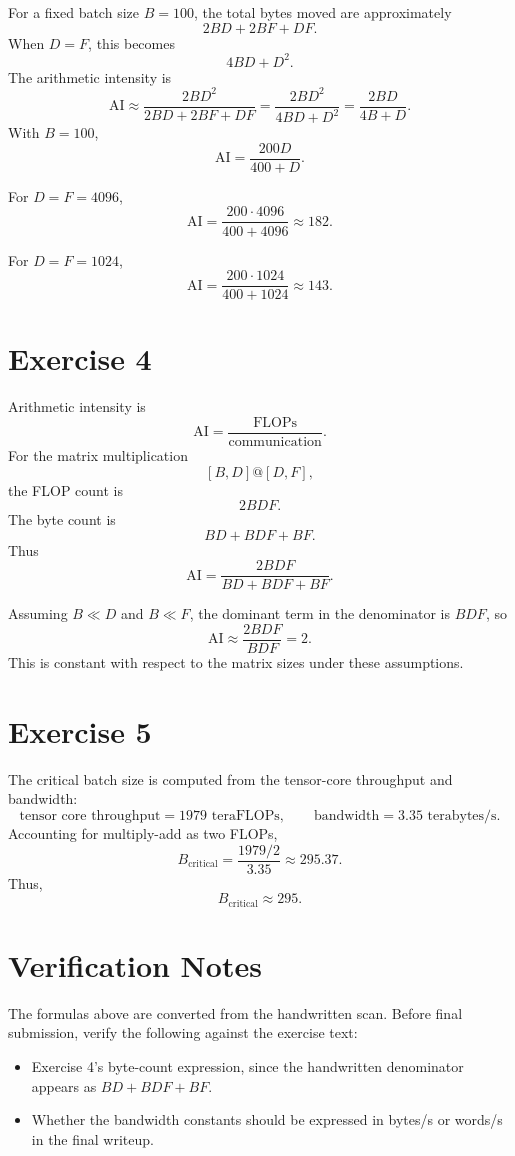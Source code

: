 \documentclass[11pt]{article}
\newcommand{\AI}{\mathrm{AI}}
\begin{document}
For a fixed batch size $B = 100$, the total bytes moved are approximately
\[
2BD + 2BF + DF.
\]
When $D = F$, this becomes
\[
4BD + D^2.
\]
The arithmetic intensity is
\[
\AI
  \approx
  \frac{2BD^2}{2BD + 2BF + DF}
  =
  \frac{2BD^2}{4BD + D^2}
  =
  \frac{2BD}{4B + D}.
\]
With $B = 100$,
\[
\AI = \frac{200D}{400 + D}.
\]

For $D = F = 4096$,
\[
\AI = \frac{200 \cdot 4096}{400 + 4096} \approx 182.
\]

For $D = F = 1024$,
\[
\AI = \frac{200 \cdot 1024}{400 + 1024} \approx 143.
\]

\section*{Exercise 4}

Arithmetic intensity is
\[
\AI = \frac{\mathrm{FLOPs}}{\mathrm{communication}}.
\]
For the matrix multiplication
\[
[B,D] @ [D,F],
\]
the FLOP count is
\[
2BDF.
\]
The byte count is
\[
BD + BDF + BF.
\]
Thus
\[
\AI = \frac{2BDF}{BD + BDF + BF}.
\]

Assuming $B \ll D$ and $B \ll F$, the dominant term in the denominator is $BDF$, so
\[
\AI \approx \frac{2BDF}{BDF} = 2.
\]
This is constant with respect to the matrix sizes under these assumptions.

\section*{Exercise 5}

The critical batch size is computed from the tensor-core throughput and bandwidth:
\[
\text{tensor core throughput} = 1979 \text{ teraFLOPs},
\qquad
\text{bandwidth} = 3.35 \text{ terabytes/s}.
\]
Accounting for multiply-add as two FLOPs,
\[
B_{\mathrm{critical}}
  =
  \frac{1979/2}{3.35}
  \approx 295.37.
\]
Thus,
\[
B_{\mathrm{critical}} \approx 295.
\]

\section*{Verification Notes}

The formulas above are converted from the handwritten scan. Before final submission, verify the following against the exercise text:

\begin{itemize}
  \item Exercise 4's byte-count expression, since the handwritten denominator appears as $BD + BDF + BF$.
  \item Whether the bandwidth constants should be expressed in bytes/s or words/s in the final writeup.
\end{itemize}
\end{document}
